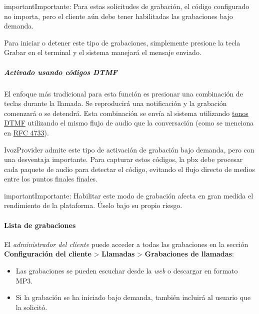 \documentclass[letterpaper,10pt,spanish]{sphinxmanual}
\begin{document}
\begin{notice}{important}{Importante:}
Para estas solicitudes de grabación, el código configurado no importa, pero el cliente aún debe tener habilitadas las grabaciones bajo demanda.
\end{notice}

Para iniciar o detener este tipo de grabaciones, simplemente presione la tecla Grabar en el terminal y el sistema manejará el mensaje enviado.


\subparagraph{Activado usando códigos \emph{DTMF}}
\label{administration_portal/client/residential/calls/call_recordings:activated-using-dtmf-codes}
El enfoque más tradicional para esta función es presionar una combinación de teclas durante la llamada. Se reproducirá una notificación y la grabación comenzará o se detendrá. Esta combinación se envía al sistema utilizando \href{https://es.wikipedia.org/wiki/Marcaci\%C3\%B3n\_por\_tonos}{tonos DTMF} utilizando el mismo flujo de audio que la conversación (como se menciona en \href{https://tools.ietf.org/html/rfc4733}{RFC 4733}).

IvozProvider admite este tipo de activación de grabación bajo demanda, pero con una desventaja importante. Para capturar estos códigos, la pbx debe procesar cada paquete de audio para detectar el código, evitando el flujo directo de medios entre los puntos finales finales.

\begin{notice}{important}{Importante:}
Habilitar este modo de grabación afecta en gran medida el rendimiento de la plataforma. Úselo bajo su propio riesgo.
\end{notice}


\paragraph{Lista de grabaciones}
\label{administration_portal/client/residential/calls/call_recordings:recordings-list}
El \emph{administrador del cliente} puede acceder a todas las grabaciones en la sección \textbf{Configuración del cliente} \textgreater{} \textbf{Llamadas} \textgreater{} \textbf{Grabaciones de llamadas}:
\begin{itemize}
\item {} 
Las grabaciones se pueden escuchar desde la \emph{web} o descargar en formato MP3.

\item {} 
Si la grabación se ha iniciado bajo demanda, también incluirá al usuario que la solicitó.

\end{itemize}
\end{document}
